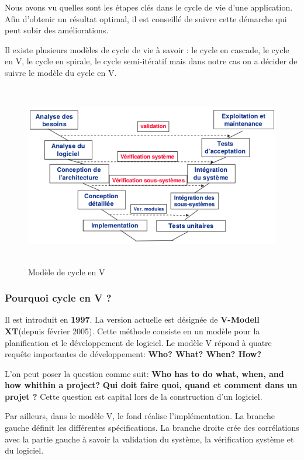 			Nous avons vu quelles sont les étapes clés dans le cycle de vie d'une 	application. Afin d'obtenir un résultat optimal, il est conseillé de suivre cette démarche qui peut subir des améliorations\cite{suppinfo}.
			
			Il existe plusieurs modèles de cycle de vie à savoir : le cycle en cascade, le cycle en V, le cycle en spirale, le cycle semi-itératif mais dans notre cas on a décider de suivre le modèle du cycle en V.
			\begin{figure}[H]
					\centering		
					\includegraphics[width=18cm, height=8cm]{../imgs/v.png} 				
					\caption{Modèle de cycle en V}
					\label{fig3}
			\end{figure}
			
			\subsubsection{Pourquoi cycle en V ?}
			Il est introduit en \textbf{1997}. La version actuelle est désignée de \textbf{V-Modell XT}(depuis février 2005). Cette méthode consiste en un modèle  pour la planification et le développement de logiciel\cite{kolyang}. Le modèle V répond à quatre requête importantes de développement: \textbf{Who? What? When? How?}
			
			L'on peut poser la question comme suit: \textbf{Who has to do what, when, and how whithin a project?} \textbf{Qui doit faire quoi, quand et comment dans un projet ? }Cette question est capital lors de la construction d'un logiciel.
			
			Par ailleurs, dans le modèle V, le fond réalise l'implémentation. La branche gauche définit les différentes spécifications. La branche droite crée des corrélations avec la partie gauche à savoir la validation du système, la vérification système et du logiciel.
			
